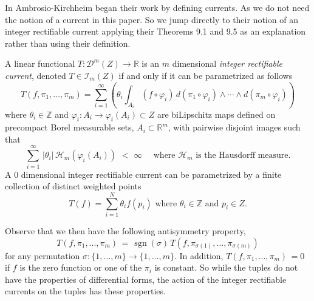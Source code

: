 \documentclass[12pt]{amsart}
\begin{document}
In \cite{AK} Ambrosio-Kirchheim began their work by defining currents. As we
do not need the notion of a current in this paper.  So we jump directly to 
their notion of an integer rectifiable current applying
their Theorems 9.1 and 9.5 as an explanation rather than using their
definition. 

A linear functional 
$
T: \mathcal{D}^m(Z) \to \mathbb{R}
$
is an $m$ dimensional {\em integer rectifiable current},
denoted $T\in {{\mathcal I}}_m(Z)$ if and only if it can be parametrized
as follows
\begin{equation}\label{param-representation}
T(f, \pi_1,...,\pi_m) = 
\sum_{i=1}^\infty 
\left(\theta_i \int_{A_i} (f\circ \varphi_i)\,
d(\pi_1\circ \varphi_i) \wedge \cdots \wedge d(\pi_m\circ \varphi_i)\right)
\end{equation}
where $\theta_i \in {\mathbb{Z}}$ and $\varphi_i:A_i \to \varphi_i(A_i)\subset Z$ are biLipschitz maps defined on 
precompact
Borel measurable sets, $A_i\subset{\mathbb{R}}^m$, with pairwise disjoint images 
 such that
\begin{equation}\label{finite-mass}
\sum_{i=1}^\infty\, |\theta_i| \,\mathcal{H}_m(\varphi_i(A_i)) \,\,<\,\, \infty
\quad
\textrm{ where } \mathcal{H}_m
\textrm{ is the Hausdorff measure.}
\end{equation}
A $0$ dimensional integer rectifiable current can be parametrized by
a finite collection of distinct weighted points
\begin{equation}\label{param-representation-0}
T(f) = 
\sum_{i=1}^N \theta_i f(p_i)
\textrm{ where } \theta_i \in {\mathbb{Z}} \textrm{ and } p_i \in Z.
\end{equation}

Observe that we then have the following antisymmetry property,
\begin{equation}
T(f, \pi_1,...,\pi_m)\,= \,{\operatorname{sgn}}(\sigma) \,T(f, \pi_{\sigma(1)},...,\pi_{\sigma(m)})
\end{equation}
for any permutation $\sigma: \{1,...,m\}\to \{1,...,m\}$.   In addition,
$
T(f, \pi_1,...,\pi_m)\,= 0 
$
if $f$ is the zero function or one of the $\pi_i$ is constant.  So while the tuples do not have the properties of differential forms, the action of the integer rectifiable currents on the tuples has these properties.
\end{document}
